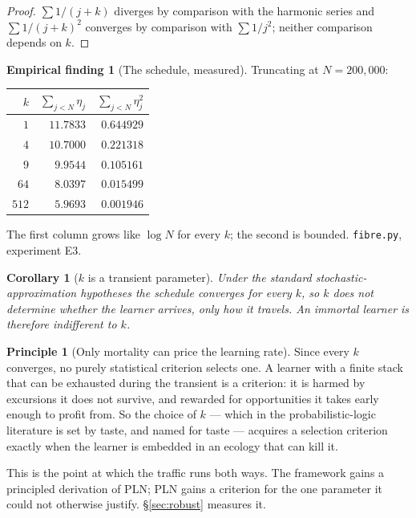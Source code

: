 \documentclass[11pt,a4paper]{article}
\theoremstyle{plain}
\newtheorem{corollary}[theorem]{Corollary}
\theoremstyle{definition}
\newtheorem{principle}[theorem]{Principle}
\newtheorem{finding}[theorem]{Empirical finding}
\theoremstyle{remark}
\begin{document}
\begin{proof}
$\sum 1/(j+k)$ diverges by comparison with the harmonic series and
$\sum 1/(j+k)^2$ converges by comparison with $\sum 1/j^2$; neither comparison
depends on $k$.
\end{proof}

\begin{finding}[The schedule, measured]\label{find:rm}
Truncating at $N = 200{,}000$:

\medskip
\begin{center}
\begin{tabular}{rrr}
\toprule
$k$ & $\sum_{j<N}\eta_j$ & $\sum_{j<N}\eta_j^2$ \\
\midrule
$1$ & $11.7833$ & $0.644929$ \\
$4$ & $10.7000$ & $0.221318$ \\
$9$ & $9.9544$ & $0.105161$ \\
$64$ & $8.0397$ & $0.015499$ \\
$512$ & $5.9693$ & $0.001946$ \\
\bottomrule
\end{tabular}
\end{center}
\medskip

\noindent The first column grows like $\log N$ for every $k$; the second is
bounded. \texttt{fibre.py}, experiment E3.
\end{finding}

\begin{corollary}[$k$ is a transient parameter]\label{cor:transient}
Under the standard stochastic-approximation hypotheses the schedule converges for
every $k$, so $k$ does not determine whether the learner arrives, only how it
travels. An immortal learner is therefore indifferent to $k$.
\end{corollary}

\begin{principle}[Only mortality can price the learning rate]\label{prin:pricek}
Since every $k$ converges, no purely statistical criterion selects one. A learner
with a finite stack that can be exhausted during the transient is a criterion:
it is harmed by excursions it does not survive, and rewarded for opportunities it
takes early enough to profit from. So the choice of $k$ --- which in the
probabilistic-logic literature is set by taste, and named for taste --- acquires
a selection criterion exactly when the learner is embedded in an ecology that can
kill it.
\end{principle}

This is the point at which the traffic runs both ways. The framework gains a
principled derivation of PLN; PLN gains a criterion for the one parameter it
could not otherwise justify. \S\ref{sec:robust} measures it.
\end{document}
